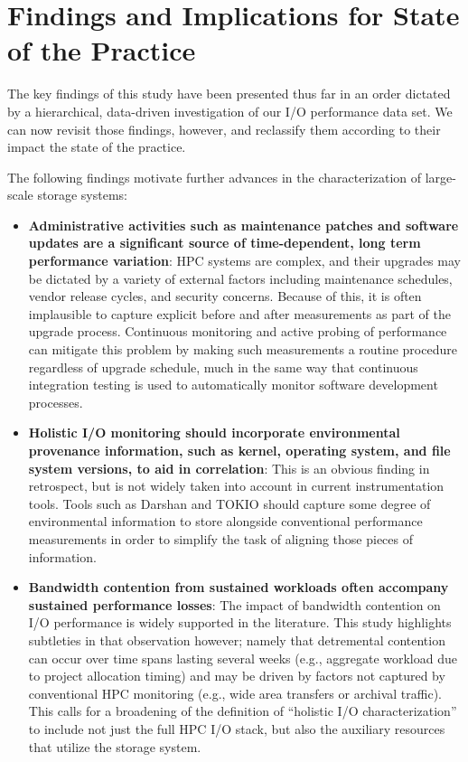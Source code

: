 \section{Findings and Implications for State of the Practice}
\label{sec:findings}

The key findings of this study have been presented thus far in an
order dictated by a hierarchical, data-driven investigation of our
I/O performance data set.  We can now revisit those findings, however,
and reclassify them according to their impact the state of
the practice.

The following findings motivate further advances in the characterization of
large-scale storage systems:

\begin{itemize}[leftmargin=*]

\item \textbf{Administrative activities such as maintenance patches and
software updates are a significant source of time-dependent, long term
performance variation}: HPC systems are complex, and their upgrades may be
dictated by a variety of external factors including maintenance schedules,
vendor release cycles, and security concerns.  Because of this, it is often
implausible to capture explicit before and after measurements as part of the
upgrade process.  Continuous monitoring and active probing of performance
can mitigate this problem by making such measurements a routine procedure regardless of upgrade
schedule, much in the same way that continuous integration  testing is used
to automatically monitor software development processes.

\item \textbf{Holistic I/O monitoring should incorporate environmental
provenance information, such as kernel, operating system, and file system
versions, to aid in correlation}: 
This is an obvious finding in retrospect, but is not widely taken into
account in current instrumentation tools.  Tools such as Darshan and
TOKIO should capture some degree of environmental information 
to store alongside conventional performance measurements in order to
simplify the task of aligning those pieces of information.

\item \textbf{Bandwidth contention from sustained workloads often accompany
sustained performance losses}: The impact of bandwidth contention on I/O
performance is widely supported in the literature.  This study highlights
subtleties in that observation however; namely that detremental contention
can occur over time spans lasting several weeks (e.g., aggregate
workload due to project allocation timing) and may be driven by factors 
not captured by conventional HPC monitoring (e.g., wide area transfers or 
archival traffic).  This calls for a broadening of the definition of
``holistic I/O characterization'' to include not just the full HPC I/O
stack, but also the auxiliary resources that utilize the storage system.

\end{itemize}

